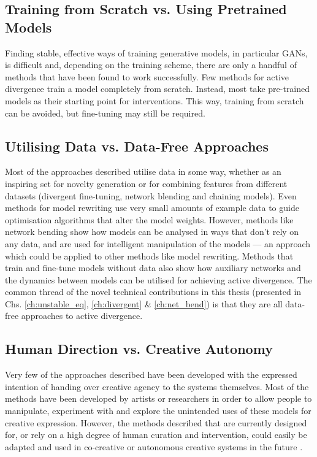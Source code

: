 \subsection{Training from Scratch vs. Using Pretrained Models}

Finding stable, effective ways of training generative models, in particular GANs, is difficult and, depending on the training scheme, there are only a handful of methods that have been found to work successfully. Few methods for active divergence train a model completely from scratch. Instead, most take pre-trained models as their starting point for interventions. This way, training from scratch can be avoided, but fine-tuning may still be required. 


\subsection{Utilising Data vs. Data-Free Approaches}
\label{c6:subsec:datafree}

Most of the approaches described utilise data in some way, whether as an inspiring set for novelty generation or for combining features from different datasets (divergent fine-tuning, network blending and chaining models). 
Even methods for model rewriting use very small amounts of example data to guide optimisation algorithms that alter the model weights. 
However, methods like network bending show how models can be analysed in ways that don't rely on any data, and are used for intelligent manipulation of the models --- an approach which could be applied to other methods like model rewriting. 
Methods that train and fine-tune models without data also show how auxiliary networks and the dynamics between models can be utilised for achieving active divergence.
The common thread of the novel technical contributions in this thesis (presented in Chs. \ref{ch:unstable_eq}, \ref{ch:divergent} \& \ref{ch:net_bend}) is that they are all data-free approaches to active divergence.

\subsection{Human Direction vs. Creative Autonomy}
Very few of the approaches described have been developed with the expressed intention of handing over creative agency to the systems themselves. Most of the methods have been developed by artists or researchers in order to allow people to manipulate, experiment with and explore the unintended uses of these models for creative expression. However, the methods described that are currently designed for, or rely on a high degree of human curation and intervention, could easily be adapted and used in co-creative or autonomous creative systems in the future \citep{berns2021automating}.

